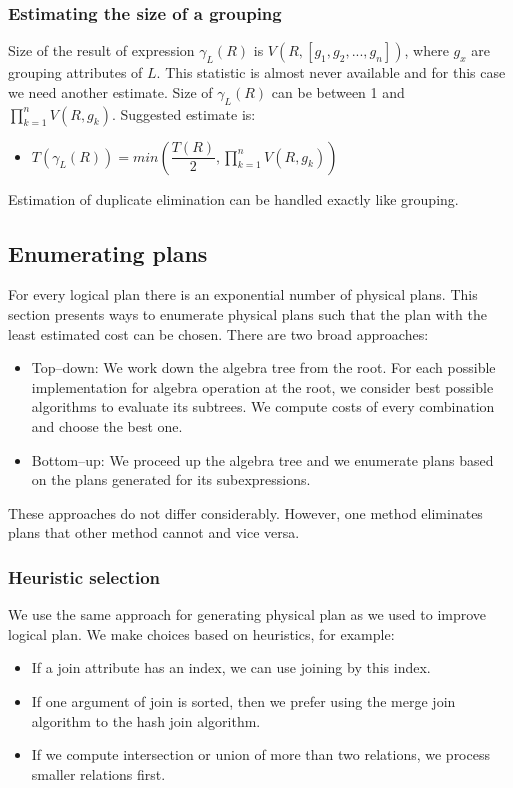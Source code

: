 \subsubsection{Estimating the size of a grouping}
Size of the result of expression $\gamma_L(R)$ is $V(R,[g_1,g_2,...,g_n])$, where $g_x$ are grouping attributes of $L$. This statistic is almost never available and for this case we need another estimate. Size of $\gamma_L(R)$ can be between 1 and $\prod_{k=1}^{n}{V(R,g_k)}$. Suggested estimate is:
\begin{itemize}
\item $T(\gamma_L(R))=min(\dfrac{T(R)}{2},\prod_{k=1}^{n}{V(R,g_k)})$
\end{itemize}
Estimation of duplicate elimination can be handled exactly like grouping.

\subsection{Enumerating plans}
For every logical plan there is an exponential number of physical plans. This section presents ways to enumerate physical plans such that the plan with the least estimated cost can be chosen. There are two broad approaches:
\begin{itemize}
\item Top--down: We work down the algebra tree from the root. For each possible implementation for algebra operation at the root, we consider best possible algorithms to evaluate its subtrees. We compute costs of every combination and choose the best one.
\item Bottom--up: We proceed up the algebra tree and we enumerate plans based on the plans generated for its subexpressions.
\end{itemize}
These approaches do not differ considerably. However, one method eliminates plans that other method cannot and vice versa.
\subsubsection{Heuristic selection}

We use the same approach for generating physical plan as we used to improve logical plan. We make choices based on heuristics, for example:

\begin{itemize}

\item If a join attribute has an index, we can use joining by this index.
\item If one argument of join is sorted, then we prefer using the merge join algorithm to the hash join algorithm.
\item If we compute intersection or union of more than two relations, we process smaller relations first.
\end{itemize}

